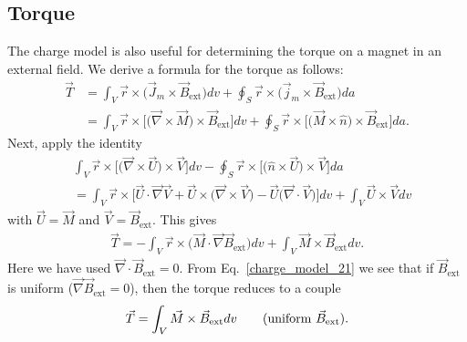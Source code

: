 \documentclass[11pt,a4paper,oneside]{book}
\numberwithin{equation}{section}
\theoremstyle{it}
\theoremstyle{definition}
\begin{document}
\subsection{Torque}
The charge model is also useful for determining the torque on a magnet in an external field. We derive a formula for the torque as follows: 
 \begin{equation}\label{charge_model_20}
	{	\begin{aligned}
			\vec{T} &= \int_{V} \vec{r}\times\Big(\vec{J}_m\times\vec{B}_{\text{ext}}\Big)dv+\oint_{S}\vec{r}\times\Big(\vec{j}_m\times\vec{B}_{\text{ext}}\Big)da\\[6pt]
			&=\int_{V}\vec{r}\times\Big[\Big(\vec{\nabla}\times\vec{M}\Big)\times\vec{B}_\text{ext}\Big]dv+\oint_{S}\vec{r}\times\Big[\Big(\vec{M}\times\hat{n}\Big)\times\vec{B}_\text{ext}\Big]da.
	\end{aligned}}
\end{equation}
Next, apply the identity
\begin{equation*}\label{}
\begin{aligned}
	&\int_{V}\vec{r}\times\Big[\Big(\vec{\nabla}\times\vec{U}\Big)\times\vec{V}\Big]dv-\oint_{S}\vec{r}\times\Big[\Big(\hat{n}\times\vec{U}\Big)\times\vec{V}\Big]da \\[6pt]
	&=\int_{V}\vec{r}\times\Big[\vec{U}\cdot\vec{\nabla}\vec{V}+\vec{U}\times\Big(\vec{\nabla}\times\vec{V}\Big)-\vec{U}\Big(\vec{\nabla}\cdot\vec{V}\Big)\Big]dv+\int_{V}\vec{U}\times\vec{V}dv
\end{aligned}
\end{equation*} 
with $\vec{U}=\vec{M}$ and $\vec{V}=\vec{B}_\text{ext}$. This gives
\begin{equation}\label{charge_model_21}
	{\begin{aligned}
			\vec{T} =-\int_{V}\vec{r}\times\Big(\vec{M}\cdot\vec{\nabla}\vec{B}_\text{ext}\Big)dv + \int_{V}\vec{M}\times\vec{B}_\text{ext}dv.
	\end{aligned}}
\end{equation} 
Here we have used $\vec{\nabla}\cdot\vec{B}_\text{ext}=0$. From Eq.~\eqref{charge_model_21} we see that if $\vec{B}_\text{ext}$ is uniform ($\vec{\nabla}\vec{B}_\text{ext}=0$), then the torque reduces to a couple
\begin{equation}\label{charge_model_22}
	{\begin{aligned}
			\vec{T} = \int_{V}\vec{M}\times\vec{B}_\text{ext}dv \qquad\text{(uniform $ \vec{B}_\text{ext}$)}.
	\end{aligned}}
\end{equation} 
\end{document}
